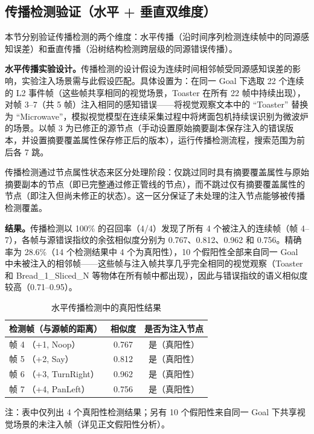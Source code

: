 \subsection{传播检测验证（水平 + 垂直双维度）}

本节分别验证传播检测的两个维度：水平传播（沿时间序列检测连续帧中的同源感知误差）和垂直传播（沿树结构检测跨层级的同源错误传播）。

\textbf{水平传播实验设计。}传播检测的设计假设为连续时间相邻帧受同源感知误差的影响，实验注入场景需与此假设匹配。具体设置为：在同一 Goal 下选取 22 个连续的 L2 事件帧（这些帧共享相同的视觉场景，Toaster 在所有 22 帧中持续出现），对帧 3–7（共 5 帧）注入相同的感知错误——将视觉观察文本中的 “Toaster” 替换为 “Microwave”，模拟视觉模型在连续采集过程中将烤面包机持续误识别为微波炉的场景。以帧 3 为已修正的源节点（手动设置原始摘要副本保存注入的错误版本，并设置摘要覆盖属性保存修正后的版本），运行传播检测流程，搜索范围为前后各 7 跳。

传播检测通过节点属性状态来区分处理阶段：仅跳过同时具有摘要覆盖属性与原始摘要副本的节点（即已完整通过修正管线的节点），而不跳过仅有摘要覆盖属性的节点（即注入但尚未修正的状态）。这一区分保证了未处理的注入节点能够被传播检测覆盖。

\textbf{结果。}传播检测以 100\% 的召回率（4/4）发现了所有 4 个被注入的连续帧（帧 4–7），各帧与源错误指纹的余弦相似度分别为 0.767、0.812、0.962 和 0.756。精确率为 28.6\%（14 个检测结果中 4 个为真阳性），10 个假阳性全部来自同一 Goal 中未被注入的相邻帧——这些帧与注入帧共享几乎完全相同的视觉观察（Toaster 和 Bread\_1\_Sliced\_N 等物体在所有帧中都出现），因此与错误指纹的语义相似度较高（0.71–0.95）。

\begin{table}[htbp]
\centering
\caption{水平传播检测中的真阳性结果}
\label{tab:5-2}
\begin{tabular}{lcc}
\toprule
检测帧（与源帧的距离） & 相似度 & 是否为注入节点 \\
\midrule
帧 4 （+1, Noop） & 0.767 & 是（真阳性） \\
帧 5 （+2, Say） & 0.812 & 是（真阳性） \\
帧 6 （+3, TurnRight） & 0.962 & 是（真阳性） \\
帧 7 （+4, PanLeft） & 0.756 & 是（真阳性） \\
\bottomrule
\end{tabular}

\smallskip
\footnotesize 注：表中仅列出 4 个真阳性检测结果；另有 10 个假阳性来自同一 Goal 下共享视觉场景的未注入帧（详见正文假阳性分析）。
\end{table}

